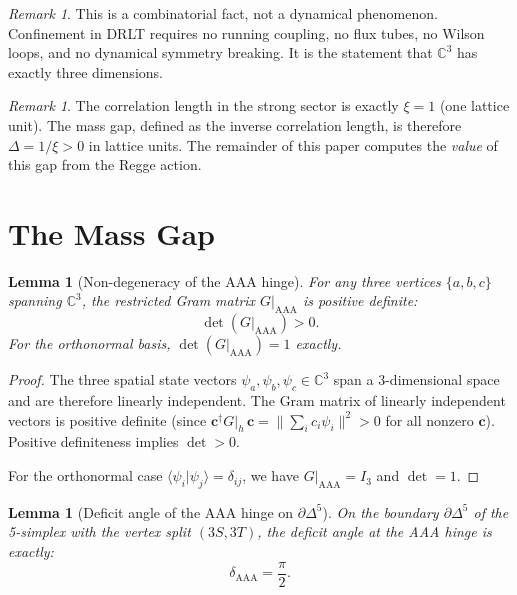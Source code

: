 \documentclass[12pt]{article}
\newtheorem{lemma}[theorem]{Lemma}
\theoremstyle{remark}
\newtheorem{remark}[theorem]{Remark}
\begin{document}
\begin{remark}
This is a combinatorial fact, not a dynamical phenomenon. Confinement
in DRLT requires no running coupling, no flux tubes, no Wilson loops,
and no dynamical symmetry breaking. It is the statement that
$\mathbb{C}^3$ has exactly three dimensions.
\end{remark}

\begin{remark}
The correlation length in the strong sector is exactly $\xi = 1$ (one
lattice unit). The mass gap, defined as the inverse correlation length,
is therefore $\Delta = 1/\xi > 0$ in lattice units. The remainder of
this paper computes the \emph{value} of this gap from the Regge action.
\end{remark}

\section{The Mass Gap}
\label{sec:massgap}

\begin{lemma}[Non-degeneracy of the AAA hinge]
\label{lem:det}
For any three vertices $\{a, b, c\}$ spanning $\mathbb{C}^3$, the
restricted Gram matrix $G|_{\mathrm{AAA}}$ is positive definite:
\begin{equation}
\det(G|_{\mathrm{AAA}}) > 0.
\end{equation}
For the orthonormal basis, $\det(G|_{\mathrm{AAA}}) = 1$ exactly.
\end{lemma}

\begin{proof}
The three spatial state vectors $\psi_a, \psi_b, \psi_c \in \mathbb{C}^3$
span a 3-dimensional space and are therefore linearly independent.
The Gram matrix of linearly independent vectors is positive definite
(since $\mathbf{c}^\dagger G|_h\, \mathbf{c} =
\|\sum_i c_i \psi_i\|^2 > 0$ for all nonzero $\mathbf{c}$).
Positive definiteness implies $\det > 0$.

For the orthonormal case $\langle \psi_i | \psi_j \rangle = \delta_{ij}$,
we have $G|_{\mathrm{AAA}} = I_3$ and $\det = 1$.
\end{proof}

\begin{lemma}[Deficit angle of the AAA hinge on $\partial\Delta^5$]
\label{lem:delta}
On the boundary $\partial\Delta^5$ of the 5-simplex with the vertex
split $(3S, 3T)$, the deficit angle at the AAA hinge is exactly:
\begin{equation}
\boxed{\delta_{\mathrm{AAA}} = \frac{\pi}{2}.}
\end{equation}
\end{lemma}
\end{document}
